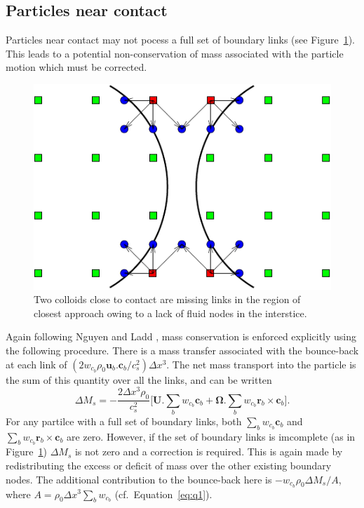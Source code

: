 \subsection{Particles near contact}

Particles near contact may not pocess a full set of boundary
links (see Figure~\ref{fig:f5}). This leads to a potential
non-conservation of mass associated with the particle motion
which must be corrected.


\begin{figure}[tb]
\begin{center}
\includegraphics{xfig/colloidclose-eps-converted-to.pdf}
\end{center}
\caption{Two colloids close to contact are missing links in the
region of closest approach owing to a lack of fluid nodes in the
interstice.}
\label{fig:f5}
\end{figure}
Again following Nguyen and Ladd \cite{nl02}, mass conservation is
enforced explicitly using the following procedure. There is a mass
transfer associated with the bounce-back at each link of
$(2w_{c_b}\rho_0 \mathbf{u}_b . \mathbf{c}_b / c_s^2) \Delta x^3$.
The net mass transport into the particle is the sum of this
quantity over all the links, and can be written
\begin{equation}
\Delta M_s = - \frac{2\Delta x^3 \rho_0}{c_s^2}
\Big[ \mathbf{U}.\sum_b w_{c_b} \mathbf{c}_b +
  \mathbf{\Omega} . \sum_b w_{c_b} \mathbf{r}_b \times \mathbf{c}_b \Big].
\end{equation}
For any partilce with a full set of boundary links, both
$\sum_b w_{c_b} \mathbf{c}_b$
and $\sum_b w_{c_b} \mathbf{r}_b \times \mathbf{c}_b$ are zero.
However, if the set of boundary links is imcomplete
(as in Figure~\ref{fig:f5}) $\Delta M_s$ is not zero and
a correction is required. This is again made by redistributing the
excess or deficit of mass over the other existing boundary nodes.
The additional contribution to the bounce-back here is
$-w_{c_b} \rho_0 \Delta M_s/A$, where
$A = \rho_0 \Delta x^3 \sum_b w_{c_b}$ (cf.\ Equation~\ref{eq:q1}).

